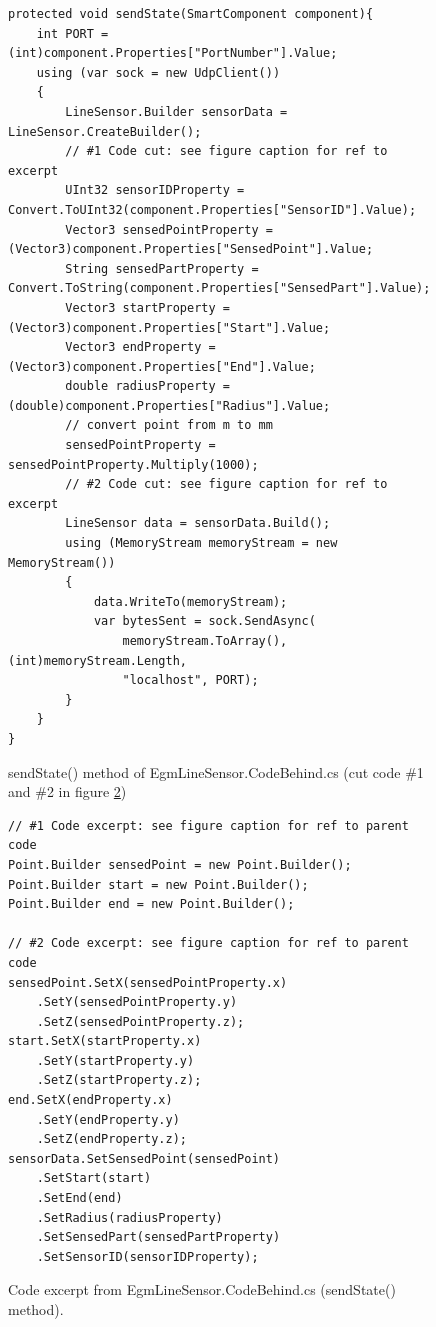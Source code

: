 \documentclass{cslthse-msc}
\begin{document}
\begin{appendices}
\lstset{language=[Sharp]C}
\begin{figure}[H]
\centering
\begin{lstlisting}[fontadjust]
protected void sendState(SmartComponent component){
    int PORT = (int)component.Properties["PortNumber"].Value;
    using (var sock = new UdpClient())
    {
        LineSensor.Builder sensorData = LineSensor.CreateBuilder();
        // #1 Code cut: see figure caption for ref to excerpt
        UInt32 sensorIDProperty = Convert.ToUInt32(component.Properties["SensorID"].Value);
        Vector3 sensedPointProperty = (Vector3)component.Properties["SensedPoint"].Value;
        String sensedPartProperty = Convert.ToString(component.Properties["SensedPart"].Value);
        Vector3 startProperty = (Vector3)component.Properties["Start"].Value;
        Vector3 endProperty = (Vector3)component.Properties["End"].Value;
        double radiusProperty = (double)component.Properties["Radius"].Value;
        // convert point from m to mm 
        sensedPointProperty = sensedPointProperty.Multiply(1000);
        // #2 Code cut: see figure caption for ref to excerpt
        LineSensor data = sensorData.Build();
        using (MemoryStream memoryStream = new MemoryStream())
        {
            data.WriteTo(memoryStream);
            var bytesSent = sock.SendAsync(
                memoryStream.ToArray(), (int)memoryStream.Length,
                "localhost", PORT);
        }
    }
}
\end{lstlisting}
\caption{sendState() method of EgmLineSensor.CodeBehind.cs (cut code \#1 and \#2 in figure \ref{fig:EgmLineSensorCodeBehind2})}
\label{fig:EgmLineSensorCodeBehind1}
\end{figure}

\lstset{language=[Sharp]C}
\begin{figure}[H]
\centering
\begin{lstlisting}[fontadjust]
// #1 Code excerpt: see figure caption for ref to parent code
Point.Builder sensedPoint = new Point.Builder();
Point.Builder start = new Point.Builder();
Point.Builder end = new Point.Builder();

// #2 Code excerpt: see figure caption for ref to parent code
sensedPoint.SetX(sensedPointProperty.x)
    .SetY(sensedPointProperty.y)
    .SetZ(sensedPointProperty.z);
start.SetX(startProperty.x)
    .SetY(startProperty.y)
    .SetZ(startProperty.z);
end.SetX(endProperty.x)
    .SetY(endProperty.y)
    .SetZ(endProperty.z);
sensorData.SetSensedPoint(sensedPoint)
    .SetStart(start)
    .SetEnd(end)
    .SetRadius(radiusProperty)
    .SetSensedPart(sensedPartProperty)
    .SetSensorID(sensorIDProperty);
\end{lstlisting}
\caption{Code excerpt from EgmLineSensor.CodeBehind.cs (sendState() method).}
\label{fig:EgmLineSensorCodeBehind2}
\end{figure}


\end{appendices}
\end{document}
